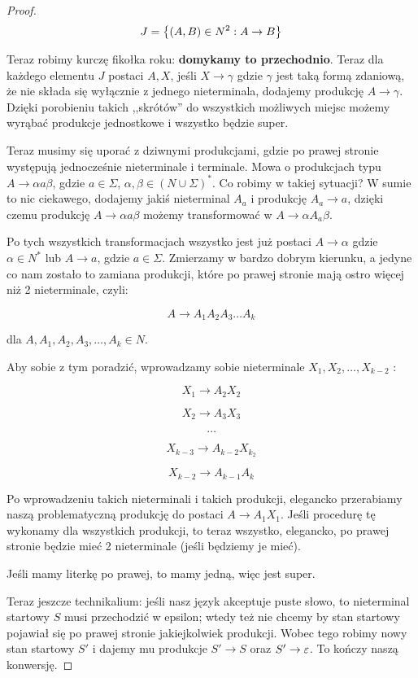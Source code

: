 \begin{proof}
	\[
		J = \set{(A, B) \in N^2 : A \rightarrow B}
	\]

	Teraz robimy kurczę fikołka roku: \textbf{domykamy to przechodnio}. Teraz dla każdego elementu \(J\) postaci \(A, X\), jeśli \(X \rightarrow \gamma\) gdzie \(\gamma\) jest taką formą zdaniową, że nie składa się wyłącznie z jednego nieterminala, dodajemy produkcję \(A \rightarrow \gamma\). Dzięki porobieniu takich ,,skrótów'' do wszystkich możliwych miejsc możemy wyrąbać produkcje jednostkowe i wszystko będzie super.

	Teraz musimy się uporać z dziwnymi produkcjami, gdzie po prawej stronie występują jednocześnie nieterminale i terminale. Mowa o produkcjach typu \(A \rightarrow \alpha a \beta\), gdzie \(a\in\Sigma\), \(\alpha, \beta \in (N \cup \Sigma)^*\).  Co robimy w takiej sytuacji? W sumie to nic ciekawego, dodajemy jakiś nieterminal \(A_a\) i produkcję \( A_a \rightarrow a\), dzięki czemu produkcję \(A \rightarrow \alpha a \beta\) możemy transformować w \(A \rightarrow \alpha A_a \beta\).

	Po tych wszystkich transformacjach wszystko jest już postaci \(A \rightarrow \alpha \) gdzie \( \alpha \in N^*\) lub \(A \rightarrow a\), gdzie \(a \in \Sigma\). Zmierzamy w bardzo dobrym kierunku, a jedyne co nam zostało to zamiana produkcji, które po prawej stronie mają ostro więcej niż 2 nieterminale, czyli:

	\[
		A \rightarrow A_1 A_2 A_3\dots A_k
	\]

	dla \(A,A_1, A_2, A_3, \dots, A_k \in N\).

	Aby sobie z tym poradzić, wprowadzamy sobie nieterminale \(X_1, X_2, \dots, X_{k-2}\) :

	\[
		X_1 \rightarrow A_2 X_2
	\]

	\[
		X_2 \rightarrow A_3 X_3
	\]

	\[
		\dots
	\]

	\[
		X_{k-3} \rightarrow A_{k-2} X_{k_2}
	\]

	\[
		X_{k-2} \rightarrow A_{k-1} A_{k}
	\]

	Po wprowadzeniu takich nieterminali i takich produkcji, elegancko przerabiamy naszą problematyczną produkcję do postaci \( A \rightarrow A_1 X_1 \). Jeśli procedurę tę wykonamy dla wszystkich produkcji, to teraz wszystko, elegancko, po prawej stronie będzie mieć 2 nieterminale (jeśli będziemy je mieć).

	Jeśli mamy literkę po prawej, to mamy jedną, więc jest super.

	Teraz jeszcze technikalium: jeśli nasz język akceptuje puste słowo, to nieterminal startowy \(S\) musi przechodzić w epsilon; wtedy też nie chcemy by stan startowy pojawiał się po prawej stronie jakiejkolwiek produkcji. Wobec tego robimy nowy stan startowy \(S'\) i dajemy mu produkcje \(S' \rightarrow S\) oraz \(S' \rightarrow \varepsilon\). To kończy naszą konwersję.

\end{proof}